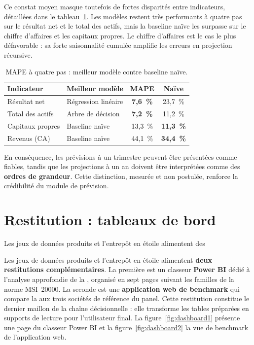 \par Ce constat moyen masque toutefois de fortes disparités entre indicateurs,
détaillées dans le tableau~\ref{tab:ml_horizon_ind}. Les modèles restent très
performants à quatre pas sur le résultat net et le total des actifs, mais la
baseline naïve les surpasse sur le chiffre d'affaires et les capitaux propres.
Le chiffre d'affaires est le cas le plus défavorable : sa forte saisonnalité
cumulée amplifie les erreurs en projection récursive.

\begin{table}[H]
\centering
\caption[Erreur à quatre pas par indicateur]{\ac{MAPE} à quatre pas : meilleur modèle contre baseline naïve.}
\label{tab:ml_horizon_ind}
\begin{tabular}{|l|l|c|c|}
\hline
\textbf{Indicateur} & \textbf{Meilleur modèle} & \textbf{MAPE} & \textbf{Naïve} \\ \hline
Résultat net & Régression linéaire & \textbf{7,6~\%} & 23,7~\% \\ \hline
Total des actifs & Arbre de décision & \textbf{7,2~\%} & 11,2~\% \\ \hline
Capitaux propres & Baseline naïve & 13,3~\% & \textbf{11,3~\%} \\ \hline
Revenus (CA) & Baseline naïve & 44,1~\% & \textbf{34,4~\%} \\ \hline
\end{tabular}
\end{table}

\par En conséquence, les prévisions à un trimestre peuvent être présentées comme
fiables, tandis que les projections à un an doivent être interprétées comme des
\textbf{ordres de grandeur}. Cette distinction, mesurée et non postulée, renforce
la crédibilité du module de prévision.


\section{Restitution : tableaux de bord}
\label{sec:resti}
\par Les jeux de données produits et l'entrepôt en étoile alimentent des
\par Les jeux de données produits et l'entrepôt en étoile alimentent
\textbf{deux restitutions complémentaires}. La première est un classeur
\textbf{Power BI} dédié à l'analyse approfondie de la
\sfbt, organisé en sept pages suivant les familles de la norme MSI~20000. La
seconde est une \textbf{application web de benchmark} qui compare la \sfbt aux
trois sociétés de référence du panel.
Cette restitution constitue le dernier maillon de la chaîne décisionnelle : elle
transforme les tables préparées en supports de lecture pour l'utilisateur final.
La figure~\ref{fig:dashboard1} présente une page du classeur Power BI et la
figure~\ref{fig:dashboard2} la vue de benchmark de l'application web.


